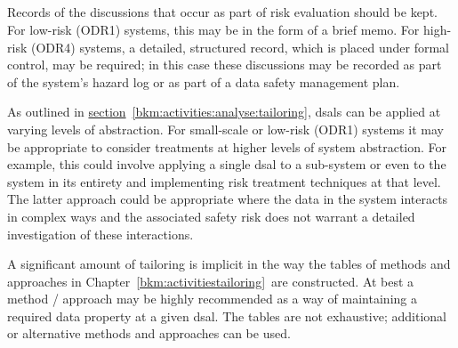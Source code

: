 \subsection{}
Records of the discussions that occur as part of risk evaluation should be kept. For low-risk (ODR1) systems, this may be in the form of a brief memo. For high-risk (ODR4) systems, a detailed, structured record, which is placed under formal control, may be required; in this case these discussions may be recorded as part of the system's \gls{hazard log} or as part of a data safety management plan.

As outlined in
\hyperref[bkm:activities:analyse:tailoring]{section}~\ref{bkm:activities:analyse:tailoring}, %
\glspl{dsal} can be applied at varying levels of abstraction. For small-scale or low-risk (ODR1) systems it may be appropriate to consider \glspl{treatment} at higher levels of system abstraction. For example, this could involve applying a single \gls{dsal} to a sub-system or even to the system in its entirety and implementing risk \gls{treatment} techniques at that level. The latter approach could be appropriate where the data in the system interacts in complex ways and the associated safety risk does not warrant a detailed investigation of these interactions.

A significant amount of \gls{tailoring} is implicit in the way the tables of methods and approaches \cbstart in Chapter~\ref{bkm:activitiestailoring}\cbend\ are constructed. At best a method / approach may be highly recommended as a way of maintaining a required data property at a given \gls{dsal}. The tables are not exhaustive; additional or alternative methods and approaches can be used.
